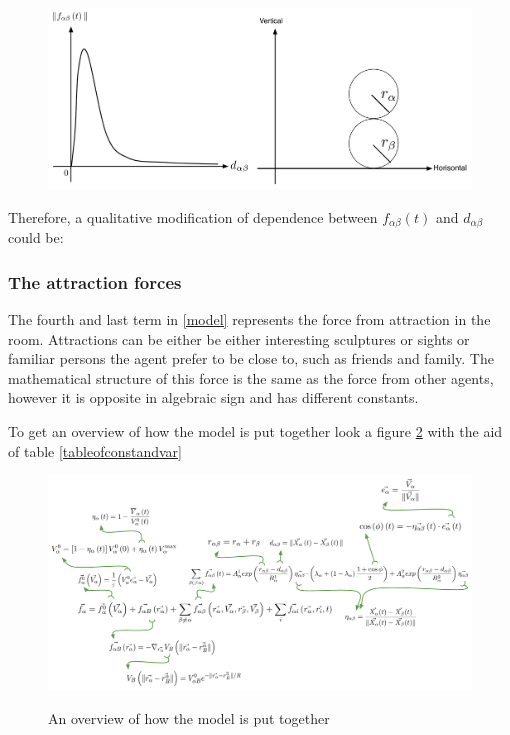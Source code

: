 \begin{figure}[ht]   
\centering
    {\includegraphics[scale=0.35]{Figures/ForceOverlapping.pdf}} 
    \caption{}
    \label{forceoverlapping}
\end{figure}

Therefore, a qualitative modification of dependence between $ f_{\alpha\beta}(t) $ and $ d_{\alpha\beta} $ could be:


\subsubsection{The attraction forces}
The fourth and last term in \eqref{model} represents the force from attraction 
in the room. Attractions can be either be either interesting sculptures or 
sights or familiar persons the agent prefer to be close to, such as friends 
and family. The mathematical structure of this force is the same as the force 
from other agents, however it is opposite in algebraic sign and has different 
constants. 

To get an overview of how the model is put together look a figure \ref{overview}
with the aid of table \ref{tableofconstandvar}

\begin{figure}[hb] %
    \centering
    {\includegraphics[scale=0.45]{Figures/overview.pdf}} 
    \caption{An overview of how the model is put together}
    \label{overview}
\end{figure}

\clearpage

